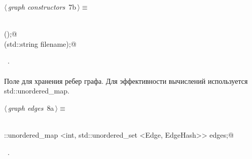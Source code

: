 \documentclass[12pt]{article}
\begin{document}
\begin{flushleft} \small
\begin{minipage}{\linewidth}\label{scrap8}\raggedright\small
{} $\langle\,${\itshape graph constructors}\nobreak\ {\footnotesize {7b}}$\,\rangle\equiv$
\vspace{-1ex}
\begin{list}{}{} \item
\mbox{}\verb@@\\
\mbox{}\verb@Graph();@\\
\mbox{}\verb@Graph(std::string filename);@\\
\mbox{}\verb@@{\NWsep}
\end{list}
\vspace{-1.5ex}
\footnotesize
\begin{list}{}{\setlength{\itemsep}{-\parsep}\setlength{\itemindent}{-\leftmargin}}
\item \NWtxtMacroRefIn\ .

\item{}
\end{list}
\end{minipage}\vspace{4ex}
\end{flushleft}
\paragraph{}
Поле для хранения ребер графа. Для эффективности вычислений используется std::unordered\_map. 

\begin{flushleft} \small
\begin{minipage}{\linewidth}\label{scrap9}\raggedright\small
{} $\langle\,${\itshape graph edges}\nobreak\ {\footnotesize {8a}}$\,\rangle\equiv$
\vspace{-1ex}
\begin{list}{}{} \item
\mbox{}\verb@@\\
\mbox{}\verb@std::unordered_map <int, std::unordered_set <Edge, EdgeHash>> edges;@\\
\mbox{}\verb@@{\NWsep}
\end{list}
\vspace{-1.5ex}
\footnotesize
\begin{list}{}{\setlength{\itemsep}{-\parsep}\setlength{\itemindent}{-\leftmargin}}
\item \NWtxtMacroRefIn\ .

\item{}
\end{list}
\end{minipage}\vspace{4ex}
\end{flushleft}
\end{document}
